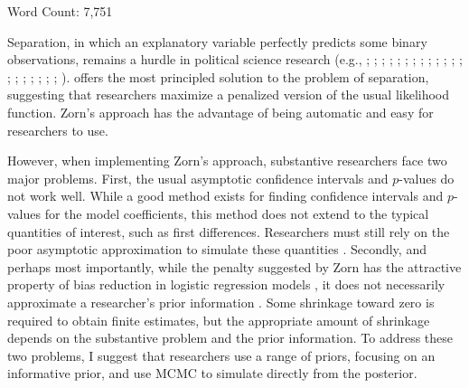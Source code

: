 \documentclass[12pt]{article}
\begin{document}
\vspace{10mm}
\begin{center}
Word Count: 7,751
\end{center}

\newpage
\doublespace

Separation, in which an explanatory variable perfectly predicts some binary observations, remains a hurdle in political science research (e.g., \citealt{BellMiller2015}; \citealt{Mares2015}; \citealt{ViningWilhelmCollens2015}; \citealt{BrownKaplow2014}; \citealt{BarrilleauxRainey2014};  \citealt{LeemanMares2014}; \citealt{Reiter2014}; \citealt{Weisiger2014}; \citealt{MinozziVolden2013}; \citealt{CedermeanGleditschHug2013}; \citealt{Fuhrmann2012}; \citealt{RoccaSanchezMorin2011}; \citealt{PetersonDrury2011}; \citealt{CoxKousserMcCubbins2010}; \citealt{Ahlquist2010}; \citealt{Rauchhaus2009}; \citealt{SmithFridkin2008}; \citealt{Casellas2008}; \citealt{DesposatoScheiner2008}; \citealt{HellerMershon2008}; \citealt{DeRouenBercovitch2008}).
\cite{Zorn2005} offers the most principled solution to the problem of separation, suggesting that researchers maximize a penalized version of the usual likelihood function. 
Zorn's approach has the advantage of being automatic and easy for researchers to use.

However, when implementing Zorn's approach, substantive researchers face two major problems. 
First, the usual asymptotic confidence intervals and $p$-values do not work well. 
While a good method exists for finding confidence intervals and $p$-values for the model coefficients, this method does not extend to the typical quantities of interest, such as first differences. 
Researchers must still rely on the poor asymptotic approximation to simulate these quantities \citep{KingTomzWittenberg2000}.  
Secondly, and perhaps most importantly, while the penalty suggested by Zorn has the attractive property of bias reduction in logistic regression models \citep{Firth1993}, it does not necessarily approximate a researcher's prior information \citep{WesternJackman1994}. 
Some shrinkage toward zero is required to obtain finite estimates, but the appropriate amount of shrinkage depends on the substantive problem and the prior information. 
To address these two problems, I suggest that researchers use a range of priors, focusing on an informative prior, and use MCMC to simulate directly from the posterior.
\end{document}
